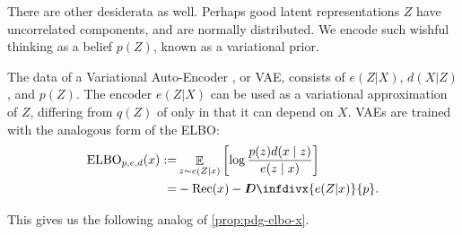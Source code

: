 \documentclass[twoside]{article}
\theoremstyle{plain}
\theoremstyle{definition}
\DeclareMathOperator*{\Ex}{\mathbb{E}} %
\newcommand{\thickD}{I\mkern-8muD}
\newcommand{\kldiv}{\thickD\infdivx}
\begin{document}
There are other desiderata as well. Perhaps good latent representations $Z$ have uncorrelated components, and are normally distributed.
We encode such wishful thinking as a belief $p(Z)$, known as a variational prior.

The data of a Variational Auto-Encoder
\parencite{kingma2013autoencoding,rezende2014stochastic}, or VAE,
consists of $e(Z|X)$, $d(X|Z)$, and $p(Z)$.
The encoder $e(Z|X)$ can be used as a variational approximation of $Z$, differing from $q(Z)$ of  only in that it can depend on $X$.
VAEs are trained with the analogous form of the ELBO:
\begin{align*}
	\mathrm{ELBO}_{p,e,d}(x) :=&
		\Ex_{z \sim e(Z|x)} \left[\log \frac{p(z) d(x\mid z)}{e(z\mid x)} \right] \\
		=& - \mathrm{Rec}(x) - \kldiv{e(Z|x)}{p}.
\end{align*}
\vspace{-3ex}

This gives us the following analog of \cref{prop:pdg-elbo-x}.
\end{document}
